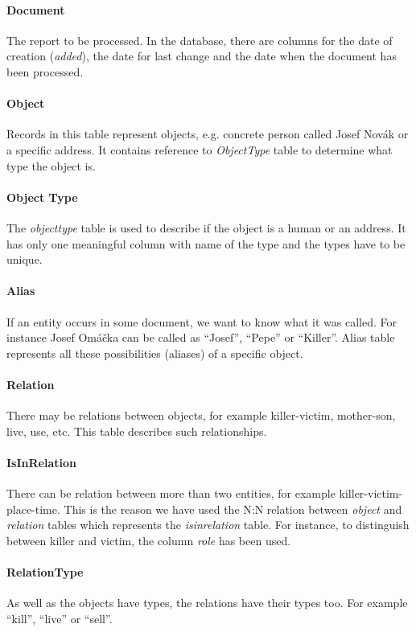 \paragraph{Document} The report to be processed. In the database, there are
columns for the date of creation (\emph{added}), the date for last change and
the date when the document has been processed.

\paragraph{Object} Records in this table represent objects, e.g. concrete person
called Josef Novák or a specific address.  It contains reference to
\emph{ObjectType} table to determine what type the object is.

\paragraph{Object Type} The \emph{objecttype} table is used to describe if the
object is a human or an address. It has only one meaningful column with name of
the type and the types have to be unique.

\paragraph{Alias} If an entity occurs in some document, we want to know what it
was called. For instance Josef Omáčka can be called as ``Josef'', ``Pepe'' or
``Killer''. Alias table represents all these possibilities (aliases) 
of a specific object.

\paragraph{Relation} There may be relations between objects, for example
killer-victim, mother-son, live, use, etc. This table describes such
relationships. 

\paragraph{IsInRelation} There can be relation between more than two entities,
for example  killer-victim-place-time. This is the reason we have used the N:N
relation  between \emph{object} and \emph{relation} tables which represents the
\emph{isinrelation} table. For instance, to distinguish between killer and
victim, the column \emph{role} has been used.

\paragraph{RelationType} As well as the objects have types, the relations have their
types too. For example ``kill'', ``live'' or ``sell''.

